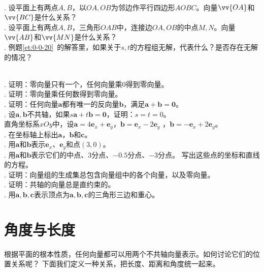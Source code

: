 \documentclass[12pt,UTF8]{ctexbook}
\begin{document}
\begin{sk}\label{sk:0-0-10}
    \mbox{}\\
    . 设平面上有两点$A,B$，以$OA, OB$为邻边作平行四边形$AOBC$。向量$\vv{OA}$和$\vv{BC}$是什么关系？\\
    . 设平面上有两点$A,B$，三角形$OAB$中，连接边$OA, OB$的中点$M,N$。向量$\vv{AB}$和$\vv{MN}$是什么关系？\\
    . 例题\ref{et:0-0-20}\ 的解答里，如果关于$s,t$的方程组无解，代表什么？是否存在无解的情况？
\end{sk}
\begin{xt}\label{xt:0-0-10}
    \mbox{} \\
    . 证明：零向量只有一个，任何向量乘$0$得到零向量。\\
    . 证明：零向量乘任何数得到零向量。\\
    . 证明：任何向量$\mathbf{a}$都有唯一的反向量$\mathbf{b}$，满足$\mathbf{a} + \mathbf{b} = \mathbf{0}$。\\
    . 设$\mathbf{a}, \mathbf{b}$不共轴，如果$s\mathbf{a} + t\mathbf{b} = \mathbf{0}$，证明：$s = t = 0$。\\
    直角坐标系$xOy$中，设$\mathbf{a} = 4\mathbf{e}_x + \mathbf{e}_y$，$\mathbf{b} = \mathbf{e}_x - 2\mathbf{e}_y$
    ，$\mathbf{b} = -\mathbf{e}_x + 2\mathbf{e}_y$。\\
    . 在坐标轴上标出$\mathbf{a}$，$\mathbf{b}$和$\mathbf{c}$。\\
    . 用$\mathbf{a}$和$\mathbf{b}$表示$\mathbf{e}_x$、$\mathbf{e}_y$和点$(3,0)$。\\
    . 用$\mathbf{a}$和$\mathbf{b}$表示它们的中点、$3$分点、$-0.5$分点、$-3$分点。
    写出这些点的坐标和直线的方程。\\
    . 证明：向量组的生成集总包含向量组中的各个向量，以及零向量。\\
    . 证明：共轴的向量总是直约束的。\\
    . 用$\mathbf{a}, \mathbf{b}, \mathbf{c}$表示顶点为$\mathbf{a}, \mathbf{b}, \mathbf{c}$的三角形三边和重心。
\end{xt}

\section{角度与长度}
根据平面的根本性质，任何向量都可以用两个不共轴向量表示。如何讨论它们的位置关系呢？
下面我们定义一种关系，把长度、距离和角度统一起来。
\end{document}
